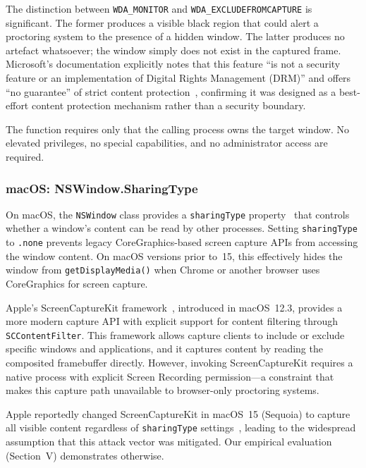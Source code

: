 \documentclass[conference]{IEEEtran}
\begin{document}
The distinction between \texttt{WDA\_MONITOR} and \texttt{WDA\_EXCLUDEFROMCAPTURE} is significant. The former produces a visible black region that could alert a proctoring system to the presence of a hidden window. The latter produces no artefact whatsoever; the window simply does not exist in the captured frame. Microsoft's documentation explicitly notes that this feature ``is not a security feature or an implementation of Digital Rights Management (DRM)'' and offers ``no guarantee'' of strict content protection~\cite{microsoft2025setwindow}, confirming it was designed as a best-effort content protection mechanism rather than a security boundary.

The function requires only that the calling process owns the target window. No elevated privileges, no special capabilities, and no administrator access are required.

\subsubsection{macOS: NSWindow.SharingType}

On macOS, the \texttt{NSWindow} class provides a \texttt{sharingType} property~\cite{apple2025sharingtype} that controls whether a window's content can be read by other processes. Setting \texttt{sharingType} to \texttt{.none} prevents legacy CoreGraphics-based screen capture APIs from accessing the window content. On macOS versions prior to~15, this effectively hides the window from \texttt{getDisplayMedia()} when Chrome or another browser uses CoreGraphics for screen capture.

Apple's ScreenCaptureKit framework~\cite{apple2025screencapturekit}, introduced in macOS~12.3, provides a more modern capture API with explicit support for content filtering through \texttt{SCContentFilter}. This framework allows capture clients to include or exclude specific windows and applications, and it captures content by reading the composited framebuffer directly. However, invoking ScreenCaptureKit requires a native process with explicit Screen Recording permission---a constraint that makes this capture path unavailable to browser-only proctoring systems.

Apple reportedly changed ScreenCaptureKit in macOS~15 (Sequoia) to capture all visible content regardless of \texttt{sharingType} settings~\cite{columbusux2025screencapturekit}, leading to the widespread assumption that this attack vector was mitigated. Our empirical evaluation (Section~V) demonstrates otherwise.
\end{document}
